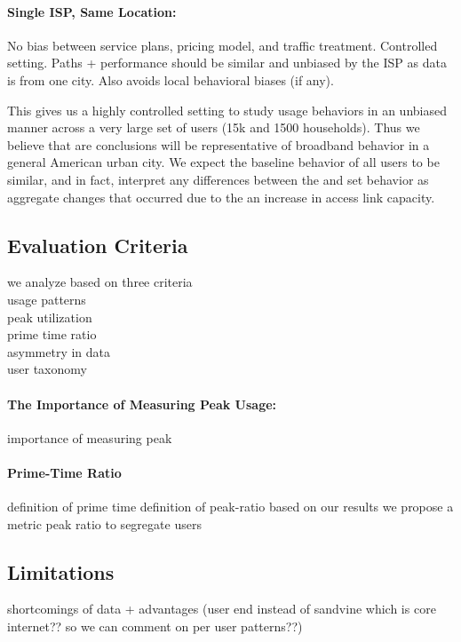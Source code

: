 \paragraph{Single ISP, Same Location:} No bias between service plans, pricing model, and traffic treatment. Controlled setting. Paths + performance should be similar and unbiased by the ISP as data is from one city. Also avoids local behavioral biases (if any).

This gives us a highly controlled setting to study usage behaviors in an unbiased manner across a very large set of users (15k \control and 1500 \test households). Thus we believe that are conclusions will be representative of broadband behavior in a general American urban city. We expect the baseline behavior of all users to be similar, and in fact, interpret any differences between the \control and \test set behavior as aggregate changes that occurred due to the an increase in access link capacity.







\subsection{Evaluation Criteria}
we analyze based on three criteria\\
usage patterns\\
peak utilization\\
prime time ratio\\
asymmetry in data\\
user taxonomy


\paragraph{The Importance of Measuring Peak Usage:}
 importance of measuring peak

\paragraph{Prime-Time Ratio} definition of prime time
definition of peak-ratio
based on our results we propose a metric peak ratio to segregate users

\subsection{Limitations}
 
 shortcomings of data + advantages (user end instead of sandvine which is core internet?? so we can comment on per user patterns??)